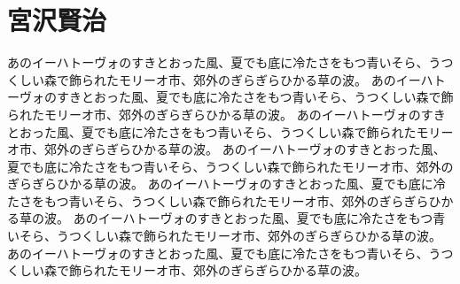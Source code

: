 \documentclass[b5j]{ltjsbook}
\begin{document}
\section{宮沢賢治}

あのイーハトーヴォのすきとおった風、夏でも底に冷たさをもつ青いそら、うつくしい森で飾られたモリーオ市、郊外のぎらぎらひかる草の波。
あのイーハトーヴォのすきとおった風、夏でも底に冷たさをもつ青いそら、うつくしい森で飾られたモリーオ市、郊外のぎらぎらひかる草の波。
あのイーハトーヴォのすきとおった風、夏でも底に冷たさをもつ青いそら、うつくしい森で飾られたモリーオ市、郊外のぎらぎらひかる草の波。
あのイーハトーヴォのすきとおった風、夏でも底に冷たさをもつ青いそら、うつくしい森で飾られたモリーオ市、郊外のぎらぎらひかる草の波。
あのイーハトーヴォのすきとおった風、夏でも底に冷たさをもつ青いそら、うつくしい森で飾られたモリーオ市、郊外のぎらぎらひかる草の波。
あのイーハトーヴォのすきとおった風、夏でも底に冷たさをもつ青いそら、うつくしい森で飾られたモリーオ市、郊外のぎらぎらひかる草の波。
あのイーハトーヴォのすきとおった風、夏でも底に冷たさをもつ青いそら、うつくしい森で飾られたモリーオ市、郊外のぎらぎらひかる草の波。
\end{document}

